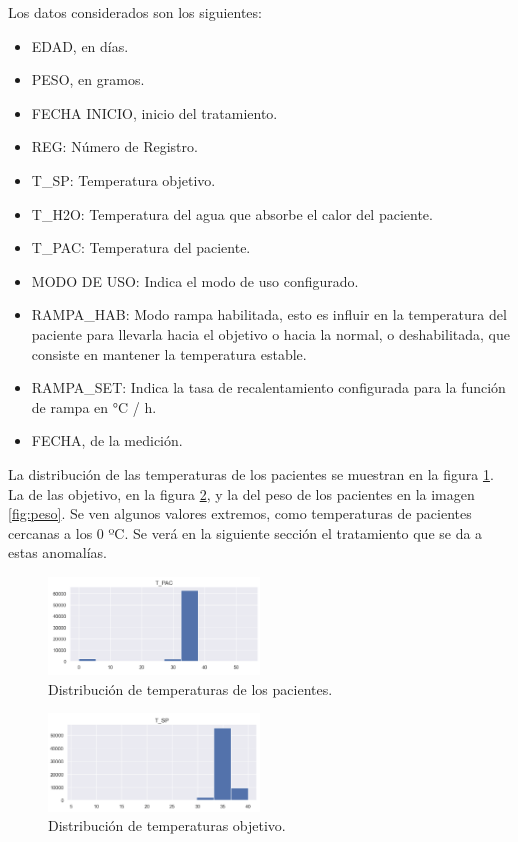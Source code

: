 Los datos considerados son los siguientes:
\begin{itemize}
	\item EDAD, en días.
	\item PESO, en gramos.
	\item FECHA INICIO, inicio del tratamiento.
	\item REG: Número de Registro.
	\item T\_SP: Temperatura objetivo.
	\item T\_H2O: Temperatura del agua que absorbe el calor del paciente.
	\item T\_PAC: Temperatura del paciente.
	\item MODO DE USO: Indica el modo de uso configurado.
	\item RAMPA\_HAB: Modo rampa habilitada, esto es influir en la temperatura del paciente para llevarla hacia el objetivo o hacia la normal, o deshabilitada, que consiste en mantener la temperatura estable.
	\item RAMPA\_SET: Indica la tasa de recalentamiento configurada para la función de rampa en °C / h.
	\item FECHA, de la medición.
\end{itemize}

La distribución de las temperaturas de los pacientes se muestran en la figura \ref{fig:pac}. La de las objetivo, en la figura \ref{fig:sp}, y la del peso de los pacientes en la imagen \ref{fig:peso}.
Se ven algunos valores extremos, como temperaturas de pacientes cercanas a los 0 ºC. Se verá en la siguiente sección el tratamiento que se da a estas anomalías. 

\begin{figure}[htbp]
\centering
\includegraphics[width=0.5\textwidth]{./Figures/dist_t_pac.png}
\caption{Distribución de temperaturas de los pacientes.}
\label{fig:pac}
\end{figure}

\begin{figure}[htbp]
	\centering
	\includegraphics[width=0.5\textwidth]{./Figures/dist_sp.png}
	\caption{Distribución de temperaturas objetivo.}
	\label{fig:sp}
\end{figure}


